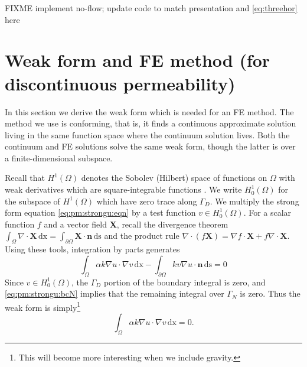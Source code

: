 \documentclass[11pt]{amsart}
\newcommand{\bn}{\mathbf{n}}
\newcommand{\bX}{\mathbf{X}}
\newcommand{\dx}{\mathrm{dx}}
\newcommand{\ds}{\mathrm{ds}}
\newcommand{\Div}{\nabla\cdot}
\newcommand{\grad}{\nabla}
\begin{document}
FIXME implement no-flow; update code to match presentation and \eqref{eq:threehor} here


\section{Weak form and FE method (for discontinuous permeability)}

In this section we derive the weak form which is needed for an FE method.  The method we use is conforming, that is, it finds a continuous approximate solution living in the same function space where the continuum solution lives.  Both the continuum and FE solutions solve the same weak form, though the latter is over a finite-dimensional subspace.

Recall that $H^1(\Omega)$ denotes the Sobolev (Hilbert) space of functions on $\Omega$ with weak derivatives which are square-integrable functions \citep[chapter 5]{Evans2010}.  We write $H_0^1(\Omega)$ for the subspace of $H^1(\Omega)$ which have zero trace along $\Gamma_D$.  We multiply the strong form equation \eqref{eq:pm:strongu:eqn} by a test function $v \in H_0^1(\Omega)$.  For a scalar function $f$ and a vector field $\bX$, recall the divergence theorem $\int_\Omega \Div \bX\,\dx = \int_{\partial \Omega} \bX\cdot \bn\,\ds$ and the product rule $\Div(f\bX) = \grad f \cdot \bX + f \Div \bX$.  Using these tools, integration by parts generates
\begin{equation}
\int_\Omega \alpha k \grad u \cdot \grad v\,\dx - \int_{\partial\Omega} k v \grad u \cdot \bn\,\ds = 0 \label{eq:weaku:early}
\end{equation}
Since $v\in H_0^1(\Omega)$, the $\Gamma_D$ portion of the boundary integral is zero, and \eqref{eq:pm:strongu:bcN} implies that the remaining integral over $\Gamma_N$ is zero.  Thus the weak form is simply\footnote{This will become more interesting when we include gravity.}
\begin{equation}
\int_\Omega \alpha k \grad u \cdot \grad v\,\dx = 0. \label{eq:weaku}
\end{equation}
\end{document}
